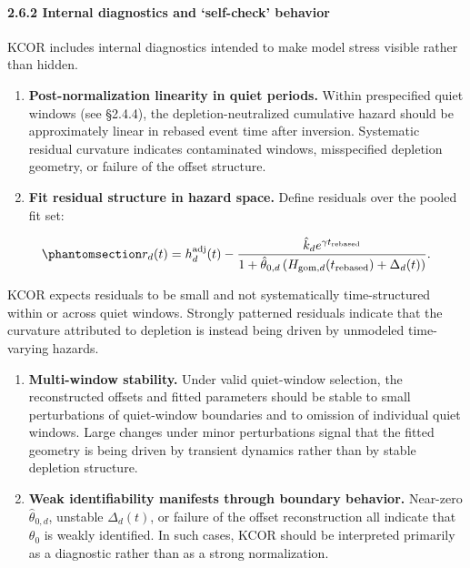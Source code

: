 \documentclass[
]{article}
\begin{document}
\paragraph{2.6.2 Internal diagnostics and `self-check'
behavior}\label{internal-diagnostics-and-self-check-behavior}

KCOR includes internal diagnostics intended to make model stress visible
rather than hidden.

\begin{enumerate}
\def\labelenumi{\arabic{enumi}.}
\item
  \textbf{Post-normalization linearity in quiet periods.} Within
  prespecified quiet windows (see §2.4.4), the depletion-neutralized
  cumulative hazard should be approximately linear in rebased event time
  after inversion. Systematic residual curvature indicates contaminated
  windows, misspecified depletion geometry, or failure of the offset
  structure.
\item
  \textbf{Fit residual structure in hazard space.} Define residuals over
  the pooled fit set:
\end{enumerate}

\begin{equation}\protect\phantomsection\label{eq:si_residuals}{
r_{d}(t)=h_d^{\mathrm{adj}}(t)-\frac{\hat{k}_d e^{\gamma t_{\mathrm{rebased}}}}{1+\hat{\theta}_{0,d}\left(H_{\mathrm{gom},d}(t_{\mathrm{rebased}})+\Delta_d(t)\right)}.
}\end{equation}

KCOR expects residuals to be small and not systematically
time-structured within or across quiet windows. Strongly patterned
residuals indicate that the curvature attributed to depletion is instead
being driven by unmodeled time-varying hazards.

\begin{enumerate}
\def\labelenumi{\arabic{enumi}.}
\setcounter{enumi}{2}
\item
  \textbf{Multi-window stability.} Under valid quiet-window selection,
  the reconstructed offsets and fitted parameters should be stable to
  small perturbations of quiet-window boundaries and to omission of
  individual quiet windows. Large changes under minor perturbations
  signal that the fitted geometry is being driven by transient dynamics
  rather than by stable depletion structure.
\item
  \textbf{Weak identifiability manifests through boundary behavior.}
  Near-zero \(\hat{\theta}_{0,d}\), unstable \(\Delta_d(t)\), or failure
  of the offset reconstruction all indicate that \(\theta_0\) is weakly
  identified. In such cases, KCOR should be interpreted primarily as a
  diagnostic rather than as a strong normalization.
\end{enumerate}
\end{document}
